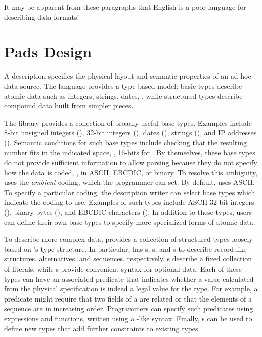 \documentclass{sig-alternate}
\begin{document}
It may be apparent from these paragraphs that English is a poor
language for describing data formats!


\section{Pads Design}

A \pads{} description specifies the physical layout and 
semantic properties of an ad hoc data source. 
The language provides a type-based model:
basic types describe atomic data such as integers, strings, dates, \etc{}, while
structured types describe compound data built from simpler pieces.
\suppressfloats

The \pads{} library provides a collection of broadly useful base types.
Examples include
8-bit unsigned integers (),
32-bit integers (),
dates (), strings (), and IP addresses ().
Semantic conditions for such base types include checking that the
resulting number fits in the indicated space, \ie, 16-bits for
.
By themselves, these base types do not provide sufficient information to allow parsing
because they do not specify how the data is coded, \ie{}, in ASCII, EBCDIC, or binary.  
To resolve this ambiguity, \pads{} uses the \textit{ambient} coding, which the programmer can set.  By default,
\pads{} uses ASCII.  To specify a particular coding, the description writer can select
base types which indicate the coding to use.  Examples of such types include
ASCII 32-bit integers (), binary bytes (), and
EBCDIC characters ().  
In addition to these types,  users can define their own base types to specify more
specialized forms of atomic data.  

To describe more complex data, \pads{} provides a collection of 
structured types loosely based on \C{}'s type structure.
In particular, \pads{} has 
s, s, and s to describe
record-like structures, alternatives, and sequences, respectively.
s describe a fixed collection of literals, while s 
provide convenient syntax for optional data.
Each of these
types can have an associated predicate that indicates whether a
value calculated from the physical specification is indeed a legal
value for the type.  For example, a predicate might require that two
fields of a  are related or that the elements
of a sequence are in increasing order.  Programmers can specify such
predicates using \pads{} expressions and functions, 
written using a \C{}-like syntax.
Finally, \pads{} s can be used
to define new types that add further constraints to existing types.
\end{document}
